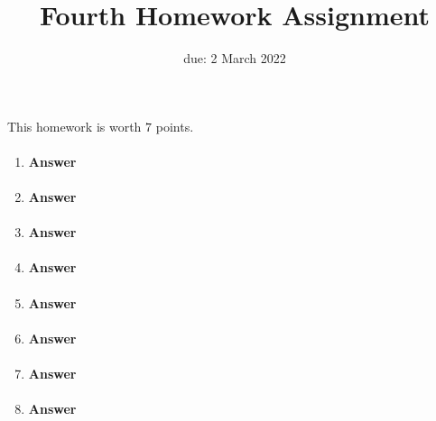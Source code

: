 \renewcommand{\hwnum}{3}

\title{Fourth Homework Assignment}
\date{due: 2 March 2022}
\maketitle

This homework is worth $7$ points.



\collab{\todo{}}

\begin{enumerate}
    \item \todo{}
        \paragraph{Answer}
        \todo{}

    \item \todo{}
        \paragraph{Answer}
        \todo{}

    \item \todo{}
        \paragraph{Answer}
        \todo{}

    \item \todo{}
        \paragraph{Answer}
        \todo{}

    \item \todo{}
        \paragraph{Answer}
        \todo{}

    \item \todo{}
        \paragraph{Answer}
        \todo{}

    \item \todo{}
        \paragraph{Answer}
        \todo{}

    \item \todo{}
        \paragraph{Answer}
        \todo{}

\end{enumerate}

